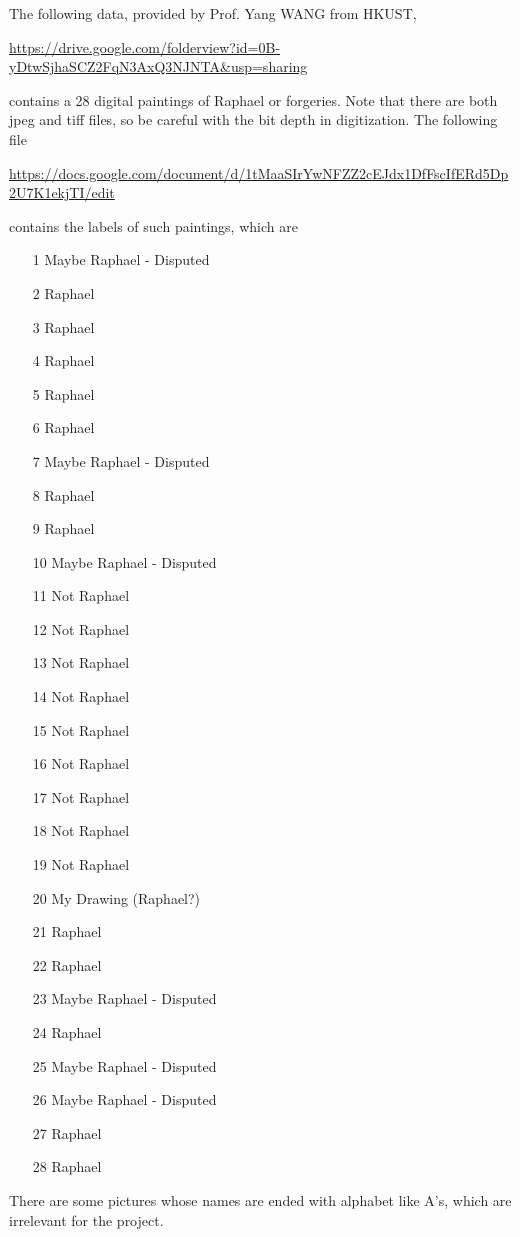 \documentclass[11pt]{article}
\begin{document}
The following data, provided by Prof. Yang WANG from HKUST,

\url{https://drive.google.com/folderview?id=0B-yDtwSjhaSCZ2FqN3AxQ3NJNTA&usp=sharing}

\noindent contains a 28 digital paintings of Raphael or forgeries. Note that there are both jpeg and tiff files, so be careful with the bit depth in digitization. The following file

\url{https://docs.google.com/document/d/1tMaaSIrYwNFZZ2cEJdx1DfFscIfERd5Dp2U7K1ekjTI/edit}

\noindent contains the labels of such paintings, which are 
\begin{enumerate}
\item[1] Maybe Raphael - Disputed
\item[2] Raphael
\item[3] Raphael
\item[4] Raphael
\item[5] Raphael
\item[6] Raphael
\item[7] Maybe Raphael - Disputed
\item[8] Raphael
\item[9] Raphael
\item[10] Maybe Raphael - Disputed
\item[11] Not Raphael
\item[12] Not Raphael
\item[13] Not Raphael
\item[14] Not Raphael
\item[15] Not Raphael
\item[16] Not Raphael
\item[17] Not Raphael
\item[18] Not Raphael
\item[19] Not Raphael
\item[20] My Drawing (Raphael?)
\item[21] Raphael
\item[22] Raphael
\item[23] Maybe Raphael - Disputed
\item[24] Raphael
\item[25] Maybe Raphael - Disputed
\item[26] Maybe Raphael - Disputed
\item[27] Raphael
\item[28] Raphael
\end{enumerate}
There are some pictures whose names are ended with alphabet like A's, which are irrelevant for the project. 
\end{document}
